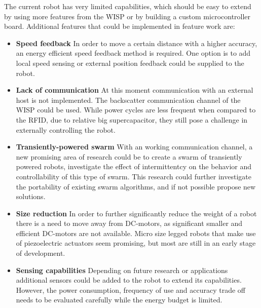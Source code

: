 The current robot has very limited capabilities, which should be easy to extend by using more features from the WISP or by building a custom microcontroller board.
Additional features that could be implemented in feature work are:

\begin{itemize}

\item \textbf{Speed feedback} 
In order to move a certain distance with a higher accuracy, an energy efficient speed feedback method is required.
One option is to add local speed sensing or external position feedback could be supplied to the robot.


\item \textbf{Lack of communication}
At this moment communication with an external host is not implemented.
The backscatter communication channel of the WISP could be used.
While power cycles are less frequent when compared to the RFID, due to relative big supercapacitor, they still pose a challenge in externally controlling the robot.

\item \textbf{Transiently-powered swarm}
With an working communication channel, a new promising area of research could be to create a swarm of transiently powered robots, investigate the effect of intermittentcy on the behavior and controllability of this type of swarm.
This research could further investigate the portability of existing swarm algorithms, and if not possible propose new solutions.	

\item \textbf{Size reduction} 
In order to further significantly reduce the weight of a robot there is a need to move away from DC-motors, as significant smaller and efficient DC-motors are not available.
Micro size legged robots that make use of piezoelectric actuators seem promising, but most are still in an early stage of development.

\item \textbf{Sensing capabilities}
Depending on future research or applications additional sensors could be added to the robot to extend its capabilities.
However, the power consumption, frequency of use and accuracy trade off needs to be evaluated carefully while the energy budget is limited.


\end{itemize}

